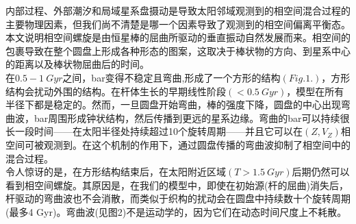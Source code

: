 \documentclass[UTF8,9pt]{ctexart}
\begin{document}
内部过程、外部潮汐和局域星系盘摄动是导致太阳邻域观测到的相空间混合过程的主要物理因素，但我们尚不清楚是哪一个因素导致了观测到的相空间偏离平衡态。本文说明相空间螺旋是由恒星棒的屈曲所驱动的垂直振动自然发展而来。相空间的包裹导致在整个圆盘上形成各种形态的图案，这取决于棒状物的方向、到星系中心的距离以及棒状物屈曲后的时间。\\
在$0.5-1\ Gyr$之间，bar变得不稳定且弯曲,形成了一个方形的结构$(Fig.1.)$，方形结构会扰动外围的结构。在杆体生长的早期线性阶段$(<0.5\ Gyr)$，模型在所有半径下都是稳定的。然而，一旦圆盘开始弯曲，棒的强度下降，圆盘的中心出现弯曲波，bar周围形成钟状结构，然后传播到更远的星系边缘。弯曲的bar可以持续很长一段时间——在太阳半径处持续超过10个旋转周期——并且它可以在$(Z,V_Z)$相空间可被观测到。在这个机制的作用下，通过圆盘传播的弯曲波抑制了相空间中的混合过程。\\
令人惊讶的是，在方形结构结束后，在太阳附近区域$(T > 1.5\ Gyr)$后期仍然可以看到相空间螺旋。其原因是，在我们的模型中，即使在初始源(杆的屈曲)消失后，杆驱动的弯曲波也不会消散，而类似于织构的扰动会在圆盘中持续数十个旋转周期(最多4 Gyr)。弯曲波(见图2)不是运动学的，因为它们在动态时间尺度上不耗散。
\end{document}
